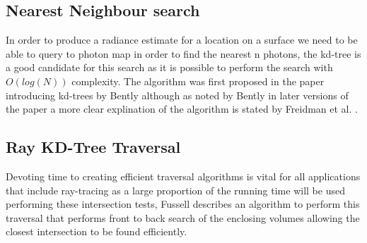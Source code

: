 \subsection{Nearest Neighbour search}
In order to produce a radiance estimate for a location on a surface we need to be able to query to
photon map in order to find the nearest n photons, the kd-tree is a good candidate for this search
as it is possible to perform the search with $O(log(N))$ complexity. The algorithm was first proposed in the
paper introducing kd-trees by Bently \cite{Bently75} although as noted by Bently in later versions of
the paper a more clear explination of the algorithm is stated by Freidman et al. \cite{Freidman77}.

\subsection{Ray KD-Tree Traversal}
Devoting time to creating efficient traversal algorithms is vital for all applications that
include ray-tracing as a large proportion of the running time will be used performing these
intersection tests, Fussell \cite{Fussell88} describes an algorithm to perform this traversal that
performs front to back search of the enclosing volumes allowing the closest intersection to be found
efficiently.
